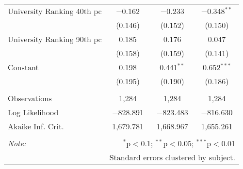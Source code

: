 \begin{table}[!htbp]
\begin{tabular}{@{\extracolsep{5pt}}lccc}
  University Ranking 40th pc & $-$0.162 & $-$0.233 & $-$0.348$^{**}$ \\ 
  & (0.146) & (0.152) & (0.150) \\ 
  University Ranking 90th pc & 0.185 & 0.176 & 0.047 \\ 
  & (0.158) & (0.159) & (0.141) \\ 
  Constant & 0.198 & 0.441$^{**}$ & 0.652$^{***}$ \\ 
  & (0.195) & (0.190) & (0.186) \\ 
 \hline \\[-1.8ex] 
Observations & 1,284 & 1,284 & 1,284 \\ 
Log Likelihood & $-$828.891 & $-$823.483 & $-$816.630 \\ 
Akaike Inf. Crit. & 1,679.781 & 1,668.967 & 1,655.261 \\ 
\hline 
\hline \\[-1.8ex] 
\textit{Note:}  & \multicolumn{3}{r}{$^{*}$p$<$0.1; $^{**}$p$<$0.05; $^{***}$p$<$0.01} \\ 
 & \multicolumn{3}{r}{Standard errors clustered by subject.} \\ 
\end{tabular} 
\end{table} 
